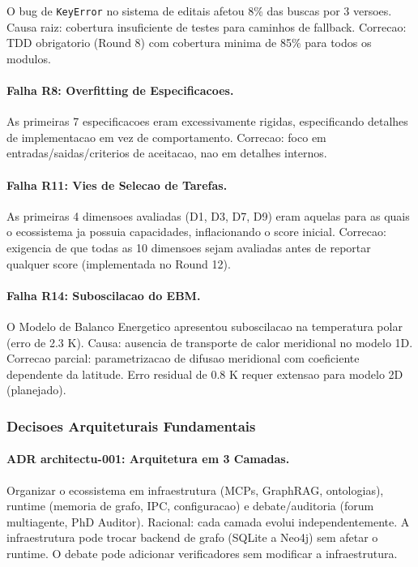 O bug de \texttt{KeyError} no sistema de editais afetou 8\% das buscas
por 3 versoes. Causa raiz: cobertura insuficiente de testes para
caminhos de fallback. Correcao: TDD obrigatorio (Round 8) com cobertura
minima de 85\% para todos os modulos.

\paragraph{Falha R8: Overfitting de Especificacoes.}

As primeiras 7 especificacoes eram excessivamente rigidas, especificando
detalhes de implementacao em vez de comportamento. Correcao: foco em
entradas/saidas/criterios de aceitacao, nao em detalhes internos.

\paragraph{Falha R11: Vies de Selecao de Tarefas.}

As primeiras 4 dimensoes avaliadas (D1, D3, D7, D9) eram aquelas para
as quais o ecossistema ja possuia capacidades, inflacionando o score
inicial. Correcao: exigencia de que todas as 10 dimensoes sejam
avaliadas antes de reportar qualquer score (implementada no Round 12).

\paragraph{Falha R14: Suboscilacao do EBM.}

O Modelo de Balanco Energetico apresentou suboscilacao na temperatura
polar (erro de 2.3 K). Causa: ausencia de transporte de calor meridional
no modelo 1D. Correcao parcial: parametrizacao de difusao meridional
com coeficiente dependente da latitude. Erro residual de 0.8 K requer
extensao para modelo 2D (planejado).

\subsubsection{Decisoes Arquiteturais Fundamentais}

\paragraph{ADR architectu-001: Arquitetura em 3 Camadas.}

Organizar o ecossistema em infraestrutura (MCPs, GraphRAG, ontologias),
runtime (memoria de grafo, IPC, configuracao) e debate/auditoria (forum
multiagente, PhD Auditor). Racional: cada camada evolui independentemente.
A infraestrutura pode trocar backend de grafo (SQLite a Neo4j) sem afetar
o runtime. O debate pode adicionar verificadores sem modificar a
infraestrutura.

